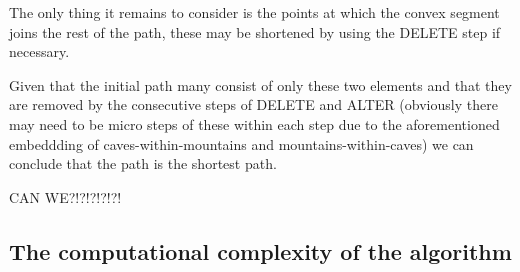 The only thing it remains to consider is the points at which the convex segment joins the rest of the path, these may be shortened by using the DELETE step if necessary.

Given that the initial path many consist of only these two elements and that they are removed by the consecutive steps of DELETE and ALTER (obviously there may need to be micro steps of these within each step due to the aforementioned embeddding of caves-within-mountains and mountains-within-caves) we can conclude that the path is the shortest path.

CAN WE?!?!?!?!?!

\subsection{The computational complexity of the algorithm}





